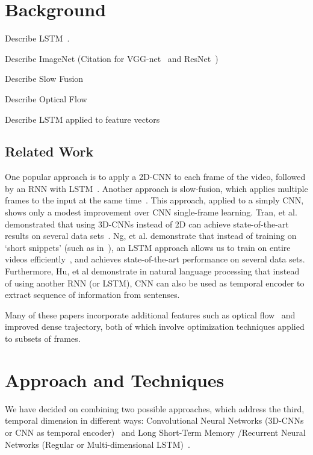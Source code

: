 \section{Background}

Describe LSTM~\cite{lstm}.

Describe ImageNet (Citation for VGG-net~\cite{vggnet} and ResNet~\cite{resnet})

Describe Slow Fusion~\cite{cnnvid}

Describe Optical Flow~\cite{brox}

Describe LSTM applied to feature vectors~\cite{}

\subsection{Related Work}
One popular approach is to apply a 2D-CNN to each frame of the video, followed by an RNN with LSTM~\cite{ltrcn}. 
Another approach is slow-fusion, which applies multiple frames to the input at the same time~\cite{cnnvid}. This approach, applied to a simply CNN, shows only a modest improvement over CNN single-frame learning.
Tran, et al. demonstrated that using 3D-CNNs instead of 2D can achieve state-of-the-art results on several data sets~\cite{stf}.
Ng, et al. demonstrate that instead of training on `short snippets' (such as in~\cite{cnnvid,stf}), an LSTM approach allows us to train on entire videos efficiently~\cite{snip}, and achieves state-of-the-art performance on several data sets. Furthermore, Hu, et al \cite{cnnMNLS} demonstrate in natural language processing that instead of using another RNN (or LSTM), CNN can also be used as temporal encoder to extract sequence of information from sentenses. 

Many of these papers incorporate additional features such as optical flow~\cite{brox} and improved dense trajectory, both of which involve optimization techniques applied to subsets of frames. 
\section{Approach and Techniques}
We have decided on combining two possible approaches, which address
the third, temporal dimension in different ways: Convolutional Neural
Networks (3D-CNNs or CNN as temporal encoder)~\cite{stf,cnnvid,cnnMNLS} and Long
Short-Term Memory /Recurrent Neural Networks (Regular or Multi-dimensional LSTM)~\cite{ltrcn}. 

